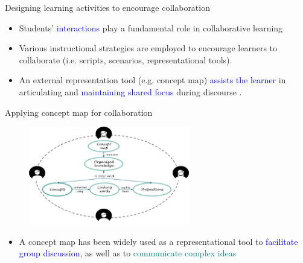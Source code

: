 \begin{frame}{Designing learning activities to encourage collaboration}
    \begin{itemize}
        \item<1-> Students' \textcolor{blue}{interactions} play a fundamental role in collaborative learning 
        \cite{Baines2009ImprovingStudy,Webb2009TheClassroom}
        \item<1-> Various instructional strategies are employed to encourage learners to collaborate 
        (i.e. scripts, scenarios, representational tools).
        \item<2> An external representation tool (e.g. concept map) \textcolor{blue}{assists the learner} in articulating and \textcolor{blue}{maintaining shared focus} during discourse \cite{Fischer2002FosteringTools,Suthers2006TechnologyCSCL,vanBoxtel2002CollaborativeDiscourse}.
    \end{itemize}
\end{frame}

\begin{frame}{Applying concept map for collaboration}

    \begin{figure}[tb]
        \begin{center}
            \includegraphics[width=70mm]{images/ccm.png}
        \end{center}
        \label{intro::ccm}
    \end{figure}
    
    \begin{itemize}
        \item A concept map has been widely used as a representational tool to \textcolor{blue}{facilitate group discussion}, as well as to \textcolor{teal}{communicate complex ideas} \cite{Fischer2002FosteringTools,Gracia-Moreno2017CollaborativeWorkspaces,Suthers2006TechnologyCSCL,vanBoxtel2000CollaborativeKnowledge}
    \end{itemize}
\end{frame}   

